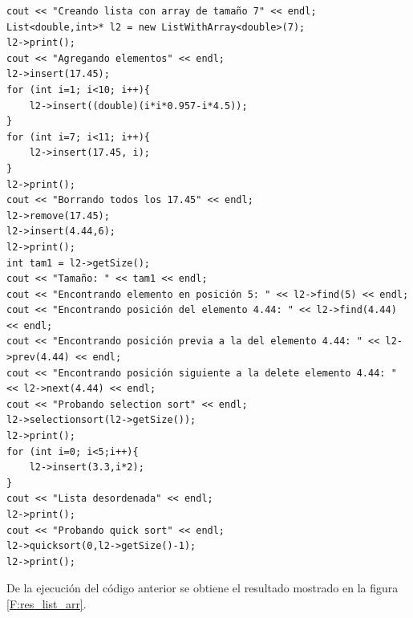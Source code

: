 \begin{verbatim}
cout << "Creando lista con array de tamaño 7" << endl;
List<double,int>* l2 = new ListWithArray<double>(7);
l2->print();
cout << "Agregando elementos" << endl;
l2->insert(17.45);
for (int i=1; i<10; i++){
    l2->insert((double)(i*i*0.957-i*4.5));
}
for (int i=7; i<11; i++){
    l2->insert(17.45, i);
}
l2->print();
cout << "Borrando todos los 17.45" << endl;
l2->remove(17.45);
l2->insert(4.44,6);
l2->print();
int tam1 = l2->getSize();
cout << "Tamaño: " << tam1 << endl;
cout << "Encontrando elemento en posición 5: " << l2->find(5) << endl;
cout << "Encontrando posición del elemento 4.44: " << l2->find(4.44) << endl;
cout << "Encontrando posición previa a la del elemento 4.44: " << l2->prev(4.44) << endl;
cout << "Encontrando posición siguiente a la delete elemento 4.44: " << l2->next(4.44) << endl;
cout << "Probando selection sort" << endl;
l2->selectionsort(l2->getSize());
l2->print();
for (int i=0; i<5;i++){
    l2->insert(3.3,i*2);
}
cout << "Lista desordenada" << endl;
l2->print();
cout << "Probando quick sort" << endl;
l2->quicksort(0,l2->getSize()-1);
l2->print();
\end{verbatim}

De la ejecución del código anterior se obtiene el resultado mostrado en la figura \ref{F:res_list_arr}.

